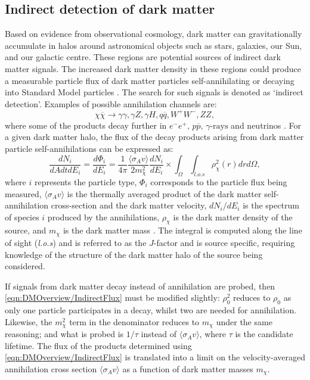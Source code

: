 \subsection{Indirect detection of dark matter}\label{sec:DMOverview/IndirectDM}
Based on evidence from observational cosmology, dark matter can gravitationally accumulate in halos around astronomical objects such as stars, galaxies, our Sun, and our galactic centre. These regions are potential sources of indirect dark matter signals. The increased dark matter density in these regions could produce a measurable particle flux of dark matter particles self-annihilating or decaying into Standard Model particles \cite{Strigari:2012acq}. The search for such signals is denoted as `indirect detection'. Examples of possible annihilation channels are:
\begin{equation}
    \chi\overline{\chi}\rightarrow\gamma\gamma,\gamma Z,\gamma H,q\overline{q},W^+W^-,ZZ,
\end{equation}
where some of the products decay further in $e^-e^+,\,p\overline{p},\,\gamma\text{-rays}$ and neutrinos \cite{DirectDetection2015}. For a given dark matter halo, the flux of the decay products arising from dark matter particle self-annihilations can be expressed as:
\begin{equation}\label{eqn:DMOverview/IndirectFlux}
    \frac{dN_i}{dAdtdE_i}=\frac{d\Phi_i}{dE_i}=\frac{1}{4\pi}\frac{\langle\sigma_Av\rangle}{2m^2_\chi}\frac{dN_i}{dE_i}\times\int_\Omega\int_{l.o.s}\rho^2_\chi(r)drd\Omega,
\end{equation}
where $i$ represents the particle type, $\Phi_i$ corresponds to the particle flux being measured, $\langle\sigma_Av\rangle$ is the thermally averaged product of the dark matter self-annihilation cross-section and the dark matter velocity, $dN_i/dE_i$ is the spectrum of species $i$ produced by the annihilations, $\rho_\chi$ is the dark matter density of the source, and $m_\chi$ is the dark matter mass \cite{PerezdelosHeros:2020qyt}. The integral is computed along the line of sight (\textit{l.o.s}) and is referred to as the $J$-factor and is source specific, requiring knowledge of the structure of the dark matter halo of the source being considered.

If signals from dark matter decay instead of annihilation are probed, then \autoref{eqn:DMOverview/IndirectFlux} must be modified slightly: $\rho_0^2$ reduces to $\rho_0$ as only one particle participates in a decay, whilst two are needed for annihilation. Likewise, the $m_\chi^2$ term in the denominator reduces to $m_\chi$ under the same reasoning; and what is probed is $1/\tau$ instead of $\langle\sigma_Av\rangle$, where $\tau$ is the candidate lifetime.
The flux of the products determined using \autoref{eqn:DMOverview/IndirectFlux} is translated into a limit on the velocity-averaged annihilation cross section $\langle\sigma_Av\rangle$ as a function of dark matter masses $m_\chi$. 

